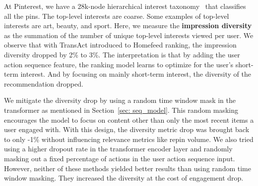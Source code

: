 At Pinterest, we have a 28k-node hierarchical interest taxonomy~\cite{interest_blog} that classifies all the pins. The top-level interests are coarse. Some examples of top-level interests are art, beauty, and sport. Here, we measure the \textbf{impression diversity} as the summation of the number of unique top-level interests viewed per user. We observe that with TransAct introduced to Homefeed ranking, the impression diversity dropped by 2\% to 3\%. The interpretation is that by adding the user action sequence feature, the ranking model learns to optimize for the user’s short-term interest. And by focusing on mainly short-term interest, the diversity of the recommendation dropped. 

We mitigate the diversity drop by using a random time window mask in the transformer as mentioned in Section~\ref{sec: seq_model}. This random masking encourages the model to focus on content other than only the most recent items a user engaged with. With this design, the diversity metric drop was brought back to only -1\% without influencing relevance metrics like repin volume. 
We also tried using a higher dropout rate in the transformer encoder layer and randomly masking out a fixed percentage of actions in the user action sequence input. However, neither of these methods yielded better results than using random time window masking. They increased the diversity at the cost of engagement drop. 





